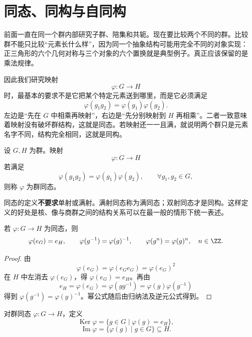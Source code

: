 \section{同态、同构与自同构}
\label{sec:homomorphism-isomorphism}

前面一直在同一个群内部研究子群、陪集和共轭。现在要比较两个不同的群。比较群不能只比较“元素长什么样”，因为同一个抽象结构可能用完全不同的对象实现：正三角形的六个几何对称与三个对象的六个置换就是典型例子。真正应该保留的是乘法规律。

因此我们研究映射
\[
\varphi:G\longrightarrow H
\]
时，最基本的要求不是它把某个特定元素送到哪里，而是它必须满足
\[
\varphi(g_1g_2)=\varphi(g_1)\varphi(g_2).
\]
左边是“先在 $G$ 中相乘再映射”，右边是“先分别映射到 $H$ 再相乘”。二者一致意味着映射没有破坏群结构，这就是同态。若映射还一一且满，就说明两个群只是元素名字不同，结构完全相同，这就是同构。


\begin{definition}[群同态]
设 $G,H$ 为群。映射
\[
\varphi:G\longrightarrow H
\]
若满足
\[
\varphi(g_1g_2)=\varphi(g_1)\varphi(g_2),
\qquad
\forall g_1,g_2\in G,
\label{eq:homomorphism}
\]
则称 $\varphi$ 为群同态。
\label{def:homomorphism}
\end{definition}

同态的定义\textbf{不要求}单射或满射。满射同态称为满同态；双射同态才是同构。这样定义的好处是核、像与商群之间的结构关系可以在最一般的情形下统一表述。

\begin{proposition}
若 $\varphi:G\to H$ 为同态，则
\[
\varphi(e_G)=e_H,
\qquad
\varphi(g^{-1})=\varphi(g)^{-1},
\qquad
\varphi(g^n)=\varphi(g)^n,
\quad n\in\ZZ.
\]
\label{prop:homomorphism-basic}

\end{proposition}

\begin{proof}
由
\[
\varphi(e_G)=\varphi(e_Ge_G)=\varphi(e_G)^2
\]
在 $H$ 中左消去 $\varphi(e_G)$，得 $\varphi(e_G)=e_H$。再由
\[
e_H=\varphi(e_G)=\varphi(gg^{-1})=\varphi(g)\varphi(g^{-1})
\]
得到 $\varphi(g^{-1})=\varphi(g)^{-1}$。幂公式随后由归纳法及逆元公式得到。
\end{proof}

\begin{definition}[核与像]
对群同态 $\varphi:G\to H$，定义
\[
\operatorname{Ker}\varphi
=\{g\in G\mid \varphi(g)=e_H\},
\]
\[
\operatorname{Im}\varphi
=\{\varphi(g)\mid g\in G\}\subseteq H.
\]
\label{def:kernel-image}
\end{definition}

